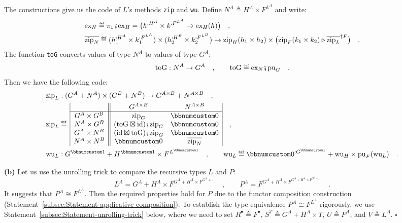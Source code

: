 The constructions give us the code of $L$\textsf{'}s methods \lstinline!zip!
and \lstinline!wu!. Define $N^{A}\triangleq H^{A}\times F^{L^{A}}$
and write: 
\begin{align*}
 & \text{ex}_{N}\triangleq\pi_{1}\bef\text{ex}_{H}=\big(h^{:H^{A}}\times k^{:F^{L^{A}}}\rightarrow\text{ex}_{H}(h)\big)\quad,\\
 & \overline{\text{zip}_{N}}\triangleq(h_{1}^{:H^{A}}\times k_{1}^{:F^{L^{A}}})\times(h_{2}^{:H^{B}}\times k_{2}^{:F^{L^{B}}})\rightarrow\text{zip}_{H}(h_{1}\times h_{2})\times\big(\text{zip}_{F}(k_{1}\times k_{2})\triangleright\overline{\text{zip}_{L}}^{\uparrow F}\big)\quad.
\end{align*}
The function \lstinline!toG! converts values of type $N^{A}$ to
values of type $G^{A}$:
\[
\text{toG}:N^{A}\rightarrow G^{A}\quad,\quad\quad\text{toG}\triangleq\text{ex}_{N}\bef\text{pu}_{G}\quad.
\]
Then we have the following code:
\begin{align*}
 & \text{zip}_{L}:(G^{A}+N^{A})\times(G^{B}+N^{B})\rightarrow G^{A\times B}+N^{A\times B}\quad,\\
 & \text{zip}_{L}\triangleq\,\begin{array}{|c||cc|}
 & G^{A\times B} & N^{A\times B}\\
\hline G^{A}\times G^{B} & \text{zip}_{G} & \bbnum 0\\
N^{A}\times G^{B} & (\text{toG}\boxtimes\text{id})\bef\text{zip}_{G} & \bbnum 0\\
G^{A}\times N^{B} & (\text{id}\boxtimes\text{toG})\bef\text{zip}_{G} & \bbnum 0\\
N^{A}\times N^{B} & \bbnum 0 & \overline{\text{zip}_{N}}
\end{array}\quad,\\
 & \text{wu}_{L}:G^{\bbnum 1}+H^{\bbnum 1}\times F^{L^{\bbnum 1}}\quad,\quad\quad\text{wu}_{L}\triangleq\bbnum 0^{:G^{\bbnum 1}}+\text{wu}_{H}\times\text{pu}_{F}(\text{wu}_{L})\quad.
\end{align*}

\textbf{(b)} Let us use the unrolling
trick to compare the recursive types $L$ and $P$:
\[
L^{A}=G^{A}+H^{A}\times F^{G^{A}+H^{A}\times F^{G^{A}+...}}\quad,\quad\quad P^{A}=F^{G^{A}+H^{A}\times F^{G^{A}+H^{A}\times F^{G^{A}+...}}}\quad.
\]
It suggests that $P^{A}\cong F^{L^{A}}$. Then the required properties
hold for $P$ due to the functor composition construction (Statement~\ref{subsec:Statement-applicative-composition}).
To establish the type equivalence $P^{A}\cong F^{L^{A}}$ rigorously,
we use Statement~\ref{subsec:Statement-unrolling-trick} below, where
we need to set $R^{\bullet}\triangleq F^{\bullet}$, $S^{T}\triangleq G^{A}+H^{A}\times T$,
$U\triangleq P^{A}$, and $V\triangleq L^{A}$. $\square$

